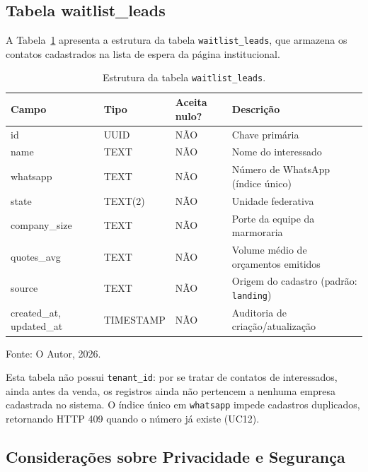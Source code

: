 \subsection{Tabela waitlist\_leads}
\label{sec:tabela-waitlist-leads}

A Tabela~\ref{tab:tabela-waitlist-leads} apresenta a estrutura da tabela \texttt{waitlist\_leads}, que armazena os contatos cadastrados na lista de espera da página institucional.

\begin{table}[H]
  \centering
  \caption{Estrutura da tabela \texttt{waitlist\_leads}.}
  \label{tab:tabela-waitlist-leads}
  \begin{tabular}{p{3.1cm}p{2.3cm}p{1.6cm}p{5.7cm}}
    \hline
    \textbf{Campo} & \textbf{Tipo} & \textbf{Aceita nulo?} & \textbf{Descrição} \\
    \hline
    id & UUID & NÃO & Chave primária \\
    name & TEXT & NÃO & Nome do interessado \\
    whatsapp & TEXT & NÃO & Número de WhatsApp (índice único) \\
    state & TEXT(2) & NÃO & Unidade federativa \\
    company\_size & TEXT & NÃO & Porte da equipe da marmoraria \\
    quotes\_avg & TEXT & NÃO & Volume médio de orçamentos emitidos \\
    source & TEXT & NÃO & Origem do cadastro (padrão: \texttt{landing}) \\
    created\_at, updated\_at & TIMESTAMP & NÃO & Auditoria de criação/atualização \\
    \hline
  \end{tabular}
  \begin{minipage}{0.95\textwidth}
    \vspace{0.3em}
    {\small Fonte: O Autor, 2026.}
  \end{minipage}
\end{table}

Esta tabela não possui \texttt{tenant\_id}: por se tratar de contatos de interessados, ainda antes da venda, os registros ainda não pertencem a nenhuma empresa cadastrada no sistema. O índice único em \texttt{whatsapp} impede cadastros duplicados, retornando HTTP 409 quando o número já existe (UC12).

\subsection{Considerações sobre Privacidade e Segurança}
\label{sec:privacidade}
\label{sec:privacidade-modelo-dados}

